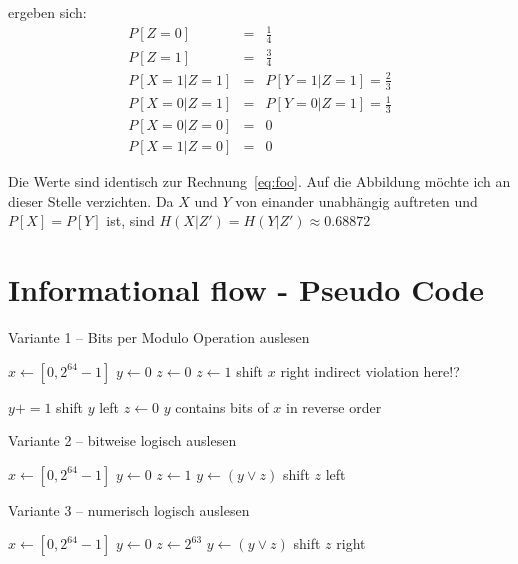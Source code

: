 ergeben sich:
\begin{eqnarray}
    P[Z=0] &=& \frac{1}{4} \\
    P[Z=1] &=& \frac{3}{4} \\
    P[X=1|Z=1] &=& P[Y=1|Z=1] = \frac{2}{3} \\
    P[X=0|Z=1] &=& P[Y=0|Z=1] = \frac{1}{3} \\
    P[X=0|Z=0] &=& 0 \\
    P[X=1|Z=0] &=& 0
\end{eqnarray}

Die Werte sind identisch zur Rechnung~\ref{eq:foo}. Auf die Abbildung möchte ich
an dieser Stelle verzichten. Da $X$ und $Y$ von einander unabhängig auftreten und
$P[X] = P[Y]$ ist, sind $H(X|Z') = H(Y|Z') \approx 0.68872$


\section{Informational flow - Pseudo Code}
\label{sec:aufgabe3}


\begin{algorithm}
\caption{Variante 1 -- Bits per Modulo Operation auslesen}
\begin{algorithmic}
    \State $x \gets [0,2^{64}-1]$
    \State $y \gets 0 $
    \State $z \gets 0 $
            \State $z \gets 1$
        \EndIf
        \State shift $x$ right
        \Comment indirect violation here!?

            \State $y += 1$
        \EndIf
        \State shift $y$ left
        \State $z \gets 0$
    \EndWhile
    \Comment $y$ contains bits of $x$ in reverse order
\end{algorithmic}
\end{algorithm}

\begin{algorithm}
\caption{Variante 2 -- bitweise logisch auslesen}
\begin{algorithmic}
    \State $x \gets [0,2^{64}-1]$
    \State $y \gets 0 $
    \State $z \gets 1 $
            \State $y \gets (y \lor z)$
        \EndIf
        \State shift $z$ left
    \EndFor
\end{algorithmic}
\end{algorithm}

\begin{algorithm}
\caption{Variante 3 -- numerisch logisch auslesen}
\label{psd:v3}
\begin{algorithmic}
    \State $x \gets [0,2^{64}-1]$
    \State $y \gets 0 $
    \State $z \gets 2^{63} $
            \State $y \gets (y \lor z)$
        \EndIf
        \State shift $z$ right
    \EndWhile
\end{algorithmic}
\end{algorithm}


